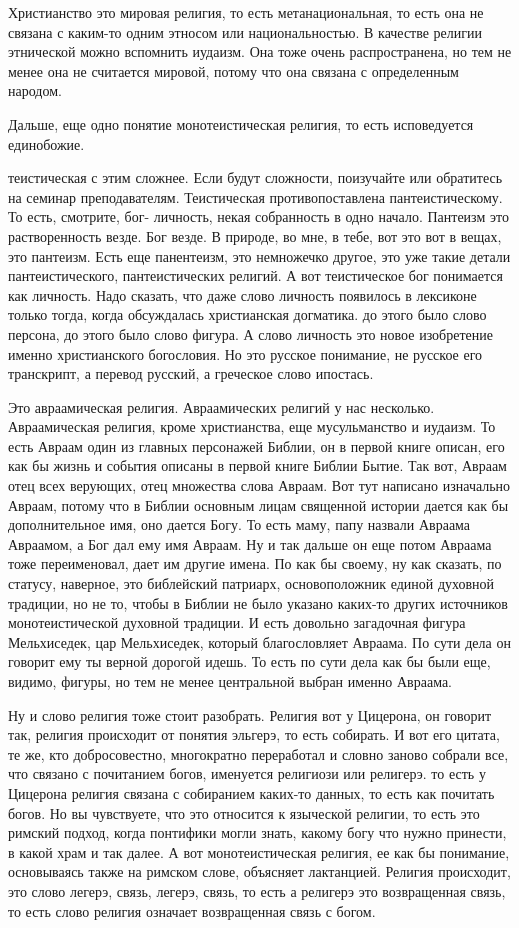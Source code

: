 Христианство это мировая религия, то
есть метанациональная, то есть она не связана с каким-то одним этносом или
национальностью. В качестве религии этнической можно вспомнить иудаизм. Она тоже
очень распространена, но тем не менее она не считается мировой, потому что она
связана с определенным народом. 

Дальше, еще одно понятие монотеистическая религия, то есть исповедуется единобожие. 

теистическая с этим сложнее. Если
будут сложности, поизучайте или обратитесь на семинар преподавателям.
Теистическая противопоставлена пантеистическому. То есть, смотрите, бог-
личность, некая собранность в одно начало. Пантеизм это растворенность везде.
Бог везде. В природе, во мне, в тебе, вот это вот в вещах, это пантеизм. Есть
еще панентеизм, это немножечко другое, это уже такие детали пантеистического,
пантеистических религий. А вот теистическое бог понимается как личность. Надо
сказать, что даже слово личность появилось в лексиконе только тогда, когда
обсуждалась христианская догматика. до этого было слово персона, до этого было
слово фигура. А слово личность это новое изобретение именно христианского
богословия. Но это русское понимание, не русское его транскрипт, а перевод
русский, а греческое слово ипостась.  

Это авраамическая религия. Авраамических религий у нас несколько. Авраамическая религия, кроме христианства, еще мусульманство и иудаизм. То есть Авраам один из главных персонажей Библии, он в первой книге описан, его как бы жизнь и события описаны в первой книге Библии Бытие. Так вот, Авраам отец всех верующих, отец множества
слова Авраам. Вот тут написано изначально Авраам, потому что в Библии основным
лицам священной истории дается как бы дополнительное имя, оно дается Богу. То
есть маму, папу назвали Авраама Авраамом, а Бог дал ему имя Авраам. Ну и так
дальше он еще потом Авраама тоже переименовал, дает им другие имена. По как бы
своему, ну как сказать, по статусу, наверное, это библейский патриарх,
основоположник единой духовной традиции, но не то, чтобы в Библии не было
указано каких-то других источников монотеистической духовной традиции. И есть
довольно загадочная фигура Мельхиседек, цар Мельхиседек, который благословляет
Авраама. По сути дела он говорит ему ты верной дорогой идешь. То есть по сути
дела как бы были еще, видимо, фигуры, но тем не менее центральной выбран именно
Авраама. 

Ну и слово религия тоже стоит разобрать.
Религия вот у Цицерона, он говорит так, религия происходит от понятия эльгерэ,
то есть собирать. И вот его цитата, те же, кто добросовестно, многократно
переработал и словно заново собрали все, что связано с почитанием богов,
именуется религиози или религерэ. то есть у Цицерона религия связана с
собиранием каких-то данных, то есть как почитать богов. Но вы чувствуете, что
это относится к языческой религии, то есть это римский подход, когда понтифики
могли знать, какому богу что нужно принести, в какой храм и так далее. А вот
монотеистическая религия, ее как бы понимание, основываясь также на римском
слове, объясняет лактанцией. Религия происходит, это слово легерэ, связь,
легерэ, связь, то есть а религерэ это возвращенная связь, то есть слово религия
означает возвращенная связь с богом. 

